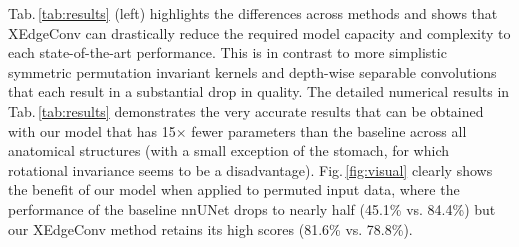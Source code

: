     Tab.\,\ref{tab:results} (left) highlights the differences across methods and shows that XEdgeConv can drastically reduce the required model capacity and complexity to each state-of-the-art performance.
    This is in contrast to more simplistic symmetric permutation invariant kernels and depth-wise separable convolutions that each result in a substantial drop in quality.
    The detailed numerical results in Tab.\,\ref{tab:results} demonstrates the very accurate results that can be obtained with our model that has 15$\times$ fewer parameters than the baseline across all anatomical structures (with a small exception of the stomach, for which rotational invariance seems to be a disadvantage). Fig.\,\ref{fig:visual} clearly shows the benefit of our model when applied to permuted input data, where the performance of the baseline nnUNet drops to nearly half (45.1\% vs. 84.4\%) but our XEdgeConv method retains its high scores (81.6\% vs. 78.8\%).

